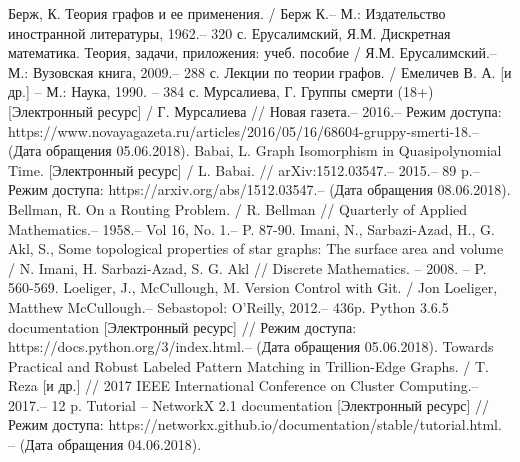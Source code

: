 

\begin{thebibliography}{}
	  Берж, К. Теория графов и ее применения. / Берж К.-- М.: Издательство иностранной литературы, 1962.-- 320 с.
	  Ерусалимский, Я.М. Дискретная математика. Теория, задачи, приложения: учеб. пособие / Я.М. Ерусалимский.-- М.: Вузовская книга, 2009.-- 288 с.
	 Лекции по теории графов. / Емеличев В. А. [и др.] -- М.: Наука, 1990. -- 384 с.	
	  Мурсалиева, Г. Группы смерти (18+) [Электронный ресурс] / Г. Мурсалиева // Новая газета.-- 2016.-- Режим доступа: https://www.novayagazeta.ru/articles/2016/05/16/68604-gruppy-smerti-18.-- (Дата обращения 05.06.2018).
	 Babai, L. Graph Isomorphism in Quasipolynomial Time. [Электронный ресурс] / L. Babai. // arXiv:1512.03547.-- 2015.-- 89 p.-- Режим доступа: https://arxiv.org/abs/1512.03547.-- (Дата обращения 08.06.2018).
	 Bellman, R. On a Routing Problem. / R. Bellman // Quarterly of Applied Mathematics.-- 1958.-- Vol 16, No. 1.-- P. 87-90.
	  Imani, N., Sarbazi-Azad, H., G. Akl, S., Some topological properties of star graphs: The surface area and volume / N. Imani, H. Sarbazi-Azad, S. G. Akl // Discrete Mathematics. – 2008. – P. 560-569.
	 Loeliger, J., McCullough, M. Version Control with Git. / Jon Loeliger, Matthew McCullough.-- Sebastopol: O'Reilly, 2012.-- 436p.
	 Python 3.6.5 documentation [Электронный ресурс] // Режим доступа: https://docs.python.org/3/index.html.-- (Дата обращения 05.06.2018).
	 Towards Practical and Robust Labeled Pattern Matching in Trillion-Edge Graphs. / T. Reza [и др.] // 2017 IEEE International Conference on Cluster Computing.-- 2017.-- 12 p.
	 Tutorial -- NetworkX 2.1 documentation [Электронный ресурс] // Режим доступа: https://networkx.github.io/documentation/stable/tutorial.html. -- (Дата обращения 04.06.2018).
\end{thebibliography}
